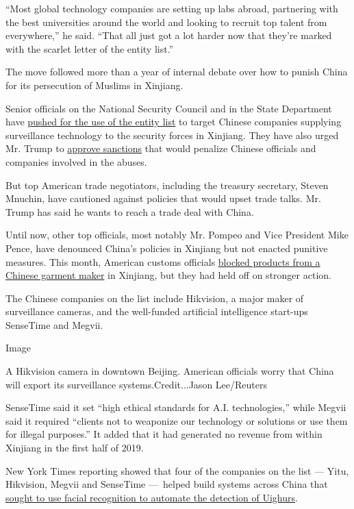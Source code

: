 ``Most global technology companies are setting up labs abroad,
partnering with the best universities around the world and looking to
recruit top talent from everywhere,'' he said. ``That all just got a lot
harder now that they're marked with the scarlet letter of the entity
list.''

The move followed more than a year of internal debate over how to punish
China for its persecution of Muslims in Xinjiang.

Senior officials on the National Security Council and in the State
Department have
\href{https://www.nytimes.com/2019/05/21/us/politics/hikvision-trump.html}{pushed
for the use of the entity list} to target Chinese companies supplying
surveillance technology to the security forces in Xinjiang. They have
also urged Mr. Trump to
\href{https://www.nytimes.com/2018/09/10/world/asia/us-china-sanctions-muslim-camps.html}{approve
sanctions} that would penalize Chinese officials and companies involved
in the abuses.

But top American trade negotiators, including the treasury secretary,
Steven Mnuchin, have cautioned against policies that would upset trade
talks. Mr. Trump has said he wants to reach a trade deal with China.

Until now, other top officials, most notably Mr. Pompeo and Vice
President Mike Pence, have denounced China's policies in Xinjiang but
not enacted punitive measures. This month, American customs officials
\href{https://www.cbp.gov/newsroom/national-media-release/cbp-issues-detention-orders-against-companies-suspected-using-forced}{blocked
products from a Chinese garment maker} in Xinjiang, but they had held
off on stronger action.

The Chinese companies on the list include Hikvision, a major maker of
surveillance cameras, and the well-funded artificial intelligence
start-ups SenseTime and Megvii.

Image

A Hikvision camera in downtown Beijing. American officials worry that
China will export its surveillance systems.Credit...Jason Lee/Reuters

SenseTime said it set ``high ethical standards for A.I. technologies,''
while Megvii said it required ``clients not to weaponize our technology
or solutions or use them for illegal purposes.'' It added that it had
generated no revenue from within Xinjiang in the first half of 2019.

New York Times reporting showed that four of the companies on the list
--- Yitu, Hikvision, Megvii and SenseTime ---~helped build systems
across China that
\href{https://www.nytimes.com/2019/04/14/technology/china-surveillance-artificial-intelligence-racial-profiling.html}{sought
to use facial recognition to automate the detection of Uighurs}.

